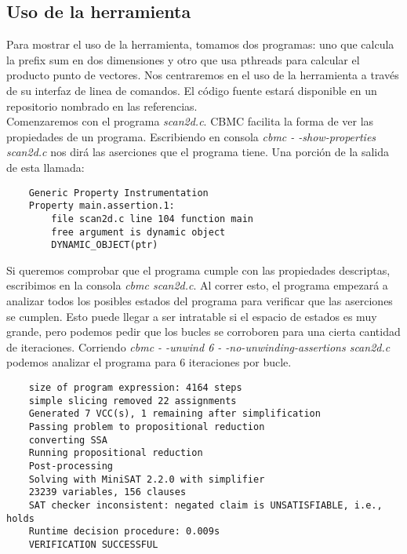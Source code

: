 \documentclass{llncs}
\begin{document}
    \subsection{Uso de la herramienta}
    Para mostrar el uso de la herramienta, tomamos dos programas: uno que
    calcula la prefix sum en dos dimensiones y otro que usa pthreads para
    calcular el producto punto de vectores. Nos centraremos en el uso de la
    herramienta a través de su interfaz de linea de comandos. El código fuente
    estará disponible
    en un repositorio nombrado en las referencias\cite{repository}.\\
    \indent Comenzaremos con el programa \emph{scan2d.c}. CBMC facilita la forma
    de ver las propiedades de un programa. Escribiendo en consola \emph{cbmc
    - -show-properties scan2d.c}  nos dirá las aserciones que el
    programa tiene. Una porción de la salida de esta llamada:\\

    {\fontsize{7}{8}\selectfont
    \begin{lstlisting}
    Generic Property Instrumentation
    Property main.assertion.1:
        file scan2d.c line 104 function main
        free argument is dynamic object
        DYNAMIC_OBJECT(ptr)
    \end{lstlisting}
    }

    \indent Si queremos comprobar que el programa cumple con las propiedades
    descriptas, escribimos en la consola \emph{cbmc scan2d.c}. Al correr esto,
    el programa empezará a analizar todos los posibles estados del programa para
    verificar que las aserciones se cumplen. Esto puede llegar a ser intratable
    si el espacio de estados es muy grande, pero podemos pedir que los bucles se
    corroboren para una cierta cantidad de iteraciones. Corriendo \emph{cbmc -
    -unwind 6 - -no-unwinding-assertions scan2d.c} podemos analizar el programa
    para 6 iteraciones por bucle.\\

    {\fontsize{7}{8}\selectfont
    \begin{lstlisting}
    size of program expression: 4164 steps
    simple slicing removed 22 assignments
    Generated 7 VCC(s), 1 remaining after simplification
    Passing problem to propositional reduction
    converting SSA
    Running propositional reduction
    Post-processing
    Solving with MiniSAT 2.2.0 with simplifier
    23239 variables, 156 clauses
    SAT checker inconsistent: negated claim is UNSATISFIABLE, i.e., holds
    Runtime decision procedure: 0.009s
    VERIFICATION SUCCESSFUL
    \end{lstlisting}
    }
\end{document}
